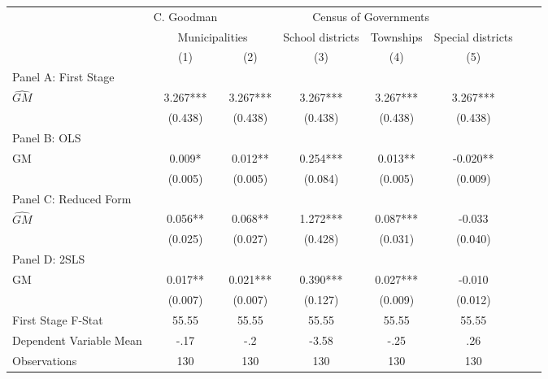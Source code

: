  \begin{tabular}{l*{7}{c}} \toprule
&\multicolumn{1}{c}{C. Goodman}&\multicolumn{4}{c}{Census of Governments}\\\cmidrule(lr){2-2}\cmidrule(lr){3-6}
&\multicolumn{2}{c}{Municipalities}&\multicolumn{1}{c}{School districts}&\multicolumn{1}{c}{Townships}&\multicolumn{1}{c}{Special districts}\\\cmidrule(lr){2-3}\cmidrule(lr){4-6}
&\multicolumn{1}{c}{(1)}&\multicolumn{1}{c}{(2)}&\multicolumn{1}{c}{(3)}&\multicolumn{1}{c}{(4)}&\multicolumn{1}{c}{(5)}\\
\cmidrule(lr){1-6}
\multicolumn{5}{l}{Panel A: First Stage}\\
\cmidrule(lr){1-6}
$\widehat{GM}$  &    3.267***&    3.267***&    3.267***&    3.267***&    3.267***\\
                &  (0.438)   &  (0.438)   &  (0.438)   &  (0.438)   &  (0.438)   \\
\cmidrule(lr){1-6}
\multicolumn{5}{l}{Panel B: OLS}\\
\cmidrule(lr){1-6}
GM              &    0.009*  &    0.012** &    0.254***&    0.013** &   -0.020** \\
                &  (0.005)   &  (0.005)   &  (0.084)   &  (0.005)   &  (0.009)   \\
\cmidrule(lr){1-6}
\multicolumn{5}{l}{Panel C: Reduced Form}\\
\cmidrule(lr){1-6}
$\widehat{GM}$  &    0.056** &    0.068** &    1.272***&    0.087***&   -0.033   \\
                &  (0.025)   &  (0.027)   &  (0.428)   &  (0.031)   &  (0.040)   \\
\cmidrule(lr){1-6}
\multicolumn{5}{l}{Panel D: 2SLS}\\
\cmidrule(lr){1-6}
GM              &    0.017** &    0.021***&    0.390***&    0.027***&   -0.010   \\
                &  (0.007)   &  (0.007)   &  (0.127)   &  (0.009)   &  (0.012)   \\
\midrule
First Stage F-Stat&    55.55   &    55.55   &    55.55   &    55.55   &    55.55   \\
Dependent Variable Mean&     -.17   &      -.2   &    -3.58   &     -.25   &      .26   \\
Observations    &      130   &      130   &      130   &      130   &      130   \\
 \bottomrule \end{tabular}
